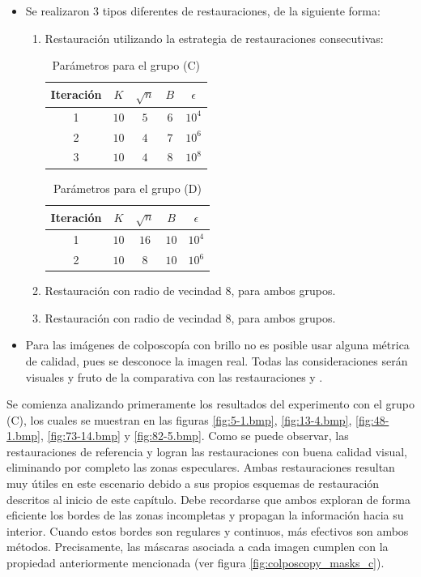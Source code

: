 \begin{itemize}
	\item Se realizaron 3 tipos diferentes de restauraciones, de la siguiente forma:
	\begin{enumerate}
		\item Restauraci\'on \SOP utilizando la estrategia de restauraciones consecutivas:
		\begin{table}[H]
			\centering
			\begin{tabular}{|c|cccc|}
				\hline
				Iteraci\'on & $K$ & $\sqrt{n}$ & $B$ & $\epsilon$ \\\hline
				1 & $10$ & $5$ & $6$ & $10^4$\\
				2 & $10$ & $4$ & $7$ & $10^6$\\
				3 & $10$ & $4$ & $8$ & $10^8$\\\hline
			\end{tabular}
			\caption{Par\'ametros para el grupo (C)}
			\label{tab:params_c}
		\end{table}
		\begin{table}[H]
			\centering
			\begin{tabular}{|c|cccc|}
				\hline
				Iteraci\'on & $K$ & $\sqrt{n}$ & $B$ & $\epsilon$ \\\hline
				1 & $10$ & $16$ & $10$ & $10^4$\\
				2 & $10$ & $8$ & $10$ & $10^6$\\\hline
			\end{tabular}
			\caption{Par\'ametros para el grupo (D)}
		\end{table}
		\item Restauraci\'on \TELEA con radio de vecindad $8$, para ambos grupos.
		\item Restauraci\'on \NS con radio de vecindad $8$, para ambos grupos.
	\end{enumerate}
	\item Para las im\'agenes de colposcop\'ia con brillo no es posible usar alguna m\'etrica de calidad, pues se desconoce la imagen real. Todas las consideraciones ser\'an visuales y fruto de la comparativa con las restauraciones \TELEA y \NS.  
\end{itemize}

\qquad

Se comienza analizando primeramente los resultados del experimento con el grupo (C), los cuales se muestran en las figuras \ref{fig:5-1.bmp}, \ref{fig:13-4.bmp}, \ref{fig:48-1.bmp}, \ref{fig:73-14.bmp} y \ref{fig:82-5.bmp}. Como se puede observar, las restauraciones de referencia \TELEA y \NS logran las restauraciones con buena calidad visual, eliminando por completo las zonas especulares. Ambas restauraciones resultan muy \'utiles en este escenario debido a sus propios esquemas de restauraci\'on descritos al inicio de este cap\'itulo. Debe recordarse que ambos exploran de forma eficiente los bordes de las zonas incompletas y propagan la información hacia su interior. Cuando estos bordes son regulares y continuos, m\'as efectivos son ambos m\'etodos. Precisamente, las m\'ascaras asociada a cada imagen cumplen con la propiedad anteriormente mencionada (ver figura \ref{fig:colposcopy_masks_c}).

